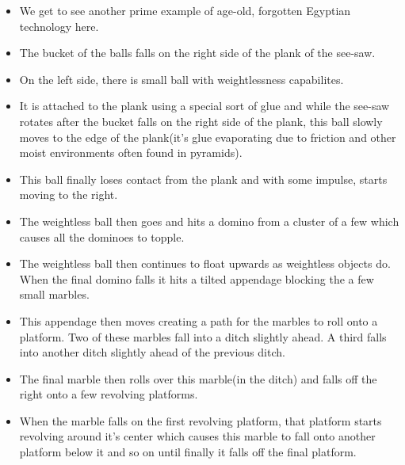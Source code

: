 \documentclass[11pt]{article}
\begin{document}
\begin{itemize}
\item We get to see another prime example of age-old, forgotten Egyptian technology here.
\item The bucket of the balls falls on the right side of the plank of the see-saw. 
 \item On the left side, there is small ball with weightlessness capabilites. 
 \item It is attached to the plank using a special sort of glue and while the see-saw rotates after the bucket falls on the right side of the plank, this ball slowly moves to the edge of the plank(it's glue evaporating due to friction and other moist environments often found in pyramids). 
 \item This ball finally loses contact from the plank and with some impulse, starts moving to the right.

\item The weightless ball then goes and hits a domino from a cluster of a few which causes all the dominoes to topple. 
\item The weightless ball then continues to float upwards as weightless objects do. When the final domino falls it hits a tilted appendage blocking the a few small marbles.
\item This appendage then moves creating a path for the marbles to roll onto a platform. Two of these marbles fall into a ditch slightly ahead. A third falls into another ditch slightly ahead of the previous ditch.
\item The final marble then rolls over this marble(in the ditch) and falls off the right onto a few revolving platforms.
\item When the marble falls on the first revolving platform, that platform starts revolving around it's center which causes this marble to fall onto another platform below it and so on until finally it falls off the final platform.
\end{itemize}
\end{document}
